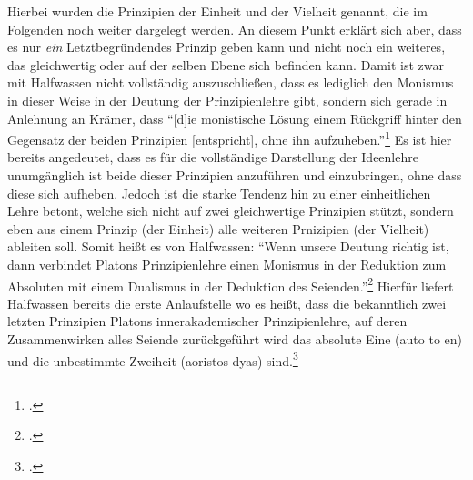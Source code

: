Hierbei wurden die Prinzipien der Einheit und der Vielheit genannt, die im Folgenden noch weiter dargelegt werden. An diesem Punkt erklärt sich aber, dass es nur \emph{ein} Letztbegründendes Prinzip geben kann und nicht noch ein weiteres, das gleichwertig oder auf der selben Ebene sich befinden kann.
Damit ist zwar mit Halfwassen nicht vollständig auszuschließen, dass es lediglich den Monismus in dieser Weise in der Deutung der Prinzipienlehre gibt, sondern sich gerade in Anlehnung an Krämer, dass \enquote{[d]ie monistische Lösung einem Rückgriff hinter den Gegensatz der beiden Prinzipien [entspricht], ohne ihn aufzuheben.}\footcite[vgl.][S. 333]{Krämer1964Geistmetaphysik} 
Es ist hier bereits angedeutet, dass es für die vollständige Darstellung der Ideenlehre unumgänglich ist beide dieser Prinzipien anzuführen und einzubringen, ohne dass diese sich aufheben. Jedoch ist die starke Tendenz hin zu einer einheitlichen Lehre betont, welche sich nicht auf zwei gleichwertige Prinzipien stützt, sondern eben aus einem Prinzip (der Einheit) alle weiteren Prnizipien (der Vielheit) ableiten soll. Somit heißt es von Halfwassen:
\enquote{Wenn unsere Deutung richtig ist, dann verbindet Platons Prinzipienlehre einen Monismus in der Reduktion zum Absoluten mit einem Dualismus in der Deduktion des Seienden.}\footcite[][S. 79]{HalfwassenMonismusDualismus} 
Hierfür liefert Halfwassen bereits die erste Anlaufstelle wo es heißt, dass die bekanntlich zwei letzten Prinzipien Platons innerakademischer Prinzipienlehre, auf deren Zusammenwirken alles Seiende zurückgeführt wird das absolute Eine (auto to en) und die unbestimmte Zweiheit (aoristos dyas) sind.\footcite[vgl.][S. 67]{HalfwassenMonismusDualismus}


